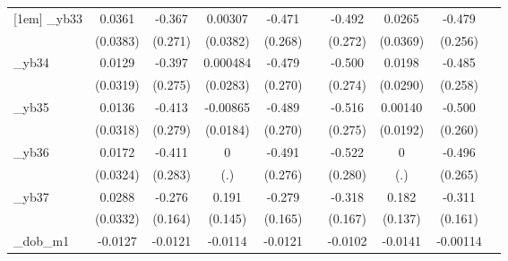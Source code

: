 \begin{table}[htbp]
\begin{tabular}{l*{9}{c}}
[1em]
\_yb33       &      0.0361         &      -0.367         &     0.00307         &      -0.471\sym{*}  &                     &      -0.492\sym{*}  &      0.0265         &      -0.479\sym{*}  &                     \\
            &    (0.0383)         &     (0.271)         &    (0.0382)         &     (0.268)         &                     &     (0.272)         &    (0.0369)         &     (0.256)         &                     \\
[1em]
\_yb34       &      0.0129         &      -0.397         &    0.000484         &      -0.479\sym{*}  &                     &      -0.500\sym{*}  &      0.0198         &      -0.485\sym{*}  &                     \\
            &    (0.0319)         &     (0.275)         &    (0.0283)         &     (0.270)         &                     &     (0.274)         &    (0.0290)         &     (0.258)         &                     \\
[1em]
\_yb35       &      0.0136         &      -0.413         &    -0.00865         &      -0.489\sym{*}  &                     &      -0.516\sym{*}  &     0.00140         &      -0.500\sym{*}  &                     \\
            &    (0.0318)         &     (0.279)         &    (0.0184)         &     (0.270)         &                     &     (0.275)         &    (0.0192)         &     (0.260)         &                     \\
[1em]
\_yb36       &      0.0172         &      -0.411         &           0         &      -0.491\sym{*}  &                     &      -0.522\sym{*}  &           0         &      -0.496\sym{*}  &                     \\
            &    (0.0324)         &     (0.283)         &         (.)         &     (0.276)         &                     &     (0.280)         &         (.)         &     (0.265)         &                     \\
[1em]
\_yb37       &      0.0288         &      -0.276\sym{*}  &       0.191         &      -0.279\sym{*}  &                     &      -0.318\sym{*}  &       0.182         &      -0.311\sym{*}  &                     \\
            &    (0.0332)         &     (0.164)         &     (0.145)         &     (0.165)         &                     &     (0.167)         &     (0.137)         &     (0.161)         &                     \\
[1em]
\_dob\_m1     &     -0.0127         &     -0.0121         &     -0.0114         &     -0.0121         &                     &     -0.0102         &     -0.0141         &    -0.00114         &                     \\

\end{tabular}
\end{table}
